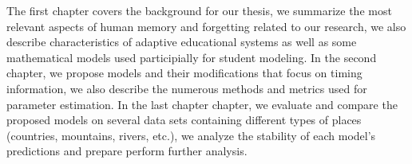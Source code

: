 The first chapter covers the background for our thesis, we summarize the most relevant aspects of human memory and forgetting related to our research, we also describe characteristics of adaptive educational systems as well as some mathematical models used participially for student modeling. In the second chapter, we propose models and their modifications that focus on timing information, we also describe the numerous methods and metrics used for parameter estimation. In the last chapter chapter, we evaluate and compare the proposed models on several data sets containing different types of places (countries, mountains, rivers, etc.), we analyze the stability of each model's predictions and prepare perform further analysis.
